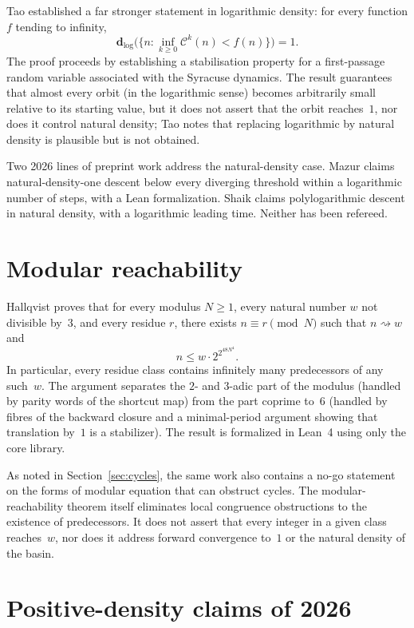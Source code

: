 \documentclass[11pt,reqno,oneside]{amsart}
\newcommand{\C}{\mathcal{C}}
\begin{document}
Tao \cite{Tao22} established a far stronger statement in logarithmic density: for every function $f$ tending to infinity,
\[
\mathbf{d}_{\log}\bigl(\{n:\inf_{k\ge 0}\C^{k}(n)<f(n)\}\bigr)=1.
\]
The proof proceeds by establishing a stabilisation property for a first-passage random variable associated with the Syracuse dynamics. The result guarantees that almost every orbit (in the logarithmic sense) becomes arbitrarily small relative to its starting value, but it does not assert that the orbit reaches~$1$, nor does it control natural density; Tao notes that replacing logarithmic by natural density is plausible but is not obtained.

Two 2026 lines of preprint work address the natural-density case. Mazur \cite{MazurND} claims natural-density-one descent below every diverging threshold within a logarithmic number of steps, with a Lean formalization. Shaik \cite{Shaik26} claims polylogarithmic descent in natural density, with a logarithmic leading time. Neither has been refereed.

\section{Modular reachability}\label{sec:modular}

Hallqvist \cite{Hallqvist26} proves that for every modulus $N\ge 1$, every natural number $w$ not divisible by~$3$, and every residue $r$, there exists $n\equiv r\pmod N$ such that $n\rightsquigarrow w$ and
\[
n\le w\cdot 2^{2^{48N^4}}.
\]
In particular, every residue class contains infinitely many predecessors of any such~$w$. The argument separates the $2$- and $3$-adic part of the modulus (handled by parity words of the shortcut map) from the part coprime to~$6$ (handled by fibres of the backward closure and a minimal-period argument showing that translation by~$1$ is a stabilizer). The result is formalized in Lean~4 using only the core library.

As noted in Section~\ref{sec:cycles}, the same work also contains a no-go statement on the forms of modular equation that can obstruct cycles. The modular-reachability theorem itself eliminates local congruence obstructions to the existence of predecessors. It does not assert that every integer in a given class reaches~$w$, nor does it address forward convergence to~$1$ or the natural density of the basin.

\section{Positive-density claims of 2026}\label{sec:posdens}
\end{document}
